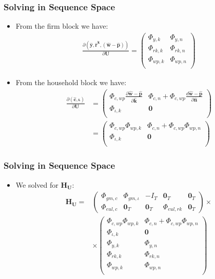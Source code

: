 \documentclass[english,xcolor=svgnames]{beamer}
\begin{document}
\begin{frame}
    \frametitle{Solving in Sequence Space}
		\begin{itemize}
			\item From the firm block we have:
			\begin{align*}
				\frac{\partial (\mathbf{\hat{y}},\mathbf{\hat{r}^k},\mathbf{(\hat{w}-\hat{p})})}{\partial \mathbf{U}} = \begin{pmatrix}
					\Phi_{y,k} & \Phi_{y,n} \\
					\Phi_{rk,k} & \Phi_{rk,n} \\
					\Phi_{wp,k} & \Phi_{wp,n} \\
				\end{pmatrix}
			\end{align*}
			\item From the household block we have:
			\begin{align*}
				\frac{\partial (\mathbf{\hat{c}},\mathbf{\iota})}{\partial \mathbf{U}} &= \begin{pmatrix}
					\Phi_{c,wp}\frac{\partial\mathbf{\hat{w}-\hat{p}}}{\partial \mathbf{\hat{k}} } & \Phi_{c,n} + \Phi_{c,wp}\frac{d\mathbf{\hat{w}-\hat{p}}}{\partial \mathbf{\hat{n}} } \\
					\Phi_{\iota,k} & \mathbf{0} \\
				\end{pmatrix} \\
				&= \begin{pmatrix}
					\Phi_{c,wp}\Phi_{wp,k} & \Phi_{c,n} + \Phi_{c,wp}\Phi_{wp,n} \\
					\Phi_{\iota,k} & \mathbf{0} \\
				\end{pmatrix}
			\end{align*}
		\end{itemize}
\end{frame}


\begin{frame}
    \frametitle{Solving in Sequence Space}
		\begin{itemize}
			\item We solved for $\mathbf{H}_{\mathbf{U}}$:
			\begin{align*}
				\mathbf{H}_{\mathbf{U}} =&\begin{pmatrix}
					\Phi_{gm,c} & \Phi_{gm,\iota} & - I_T & \mathbf{0}_T & \mathbf{0}_T \\ 
					\Phi_{eul,c} & \mathbf{0}_T & \mathbf{0}_T & \Phi_{eul,rk} & \mathbf{0}_T  
				\end{pmatrix} \times \\
				& \times \begin{pmatrix}
					\Phi_{c,wp}\Phi_{wp,k} & \Phi_{c,n} + \Phi_{c,wp}\Phi_{wp,n} \\
					\Phi_{\iota,k} & \mathbf{0} \\
					\Phi_{y,k} & \Phi_{y,n} \\
					\Phi_{rk,k} & \Phi_{rk,n} \\
					\Phi_{wp,k} & \Phi_{wp,n} \\
				\end{pmatrix}
			\end{align*}
		\end{itemize}
\end{frame}
\end{document}
